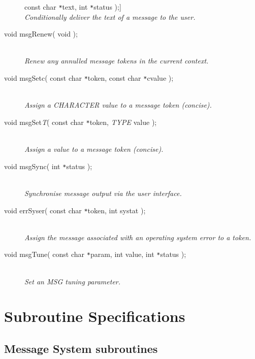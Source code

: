 \documentclass[twoside,11pt]{article}
\newcommand{\xlabel}[1]{}
\renewcommand{\_}{\texttt{\symbol{95}}}
\newcommand{\listline}{\hspace{1pt}\\}
\newcommand{\listline}{}
\begin{document}
\begin{description}
const char \texttt{*}text, int \texttt{*}status );] \listline
\textit{Conditionally deliver the text of a message to the user.}
\item[void msgRenew( void );] \listline
\textit{Renew any annulled message tokens in the current context.}
\item[void msgSetc( const char \texttt{*}token,
const char \texttt{*}cvalue );] \listline
\textit{Assign a CHARACTER value to a message token (concise).}
\item[void msgSet\textit{T}( const char \texttt{*}token,
\textit{TYPE} value );] \listline
\textit{Assign a value to a message token (concise).}
\item[void msgSync( int \texttt{*}status );] \listline
\textit{Synchronise message output via the user interface.}
\item[void errSyser( const char \texttt{*}token, int systat );] \listline
\textit{Assign the message associated with an operating system error to a
token.}
\item[void msgTune( const char \texttt{*}param, int value,
int \texttt{*}status );] \listline
\textit{Set an MSG tuning parameter.}
\end{description}

\newpage
\section{\xlabel{subroutine_specifications}Subroutine Specifications \label{specs_sect}}
\subsection{\xlabel{message_system_subroutines}Message System subroutines}
\end{document}
